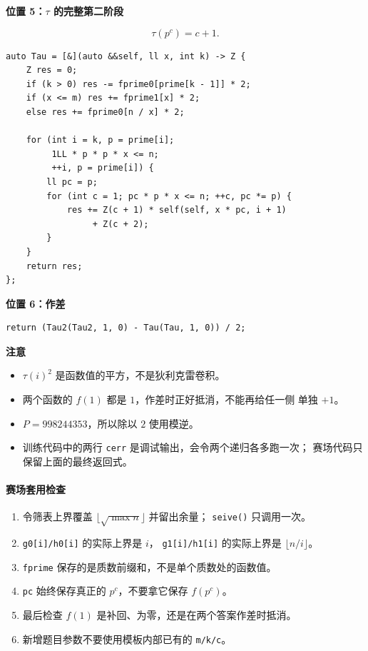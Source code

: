 \textbf{位置 5：\(\tau\) 的完整第二阶段}

\[
\tau(p^c)=c+1.
\]

\begin{verbatim}
auto Tau = [&](auto &&self, ll x, int k) -> Z {
    Z res = 0;
    if (k > 0) res -= fprime0[prime[k - 1]] * 2;
    if (x <= m) res += fprime1[x] * 2;
    else res += fprime0[n / x] * 2;

    for (int i = k, p = prime[i];
         1LL * p * p * x <= n;
         ++i, p = prime[i]) {
        ll pc = p;
        for (int c = 1; pc * p * x <= n; ++c, pc *= p) {
            res += Z(c + 1) * self(self, x * pc, i + 1)
                 + Z(c + 2);
        }
    }
    return res;
};
\end{verbatim}

\textbf{位置 6：作差}

\begin{verbatim}
return (Tau2(Tau2, 1, 0) - Tau(Tau, 1, 0)) / 2;
\end{verbatim}

\textbf{注意}

\begin{itemize}
    \item \(\tau(i)^2\) 是函数值的平方，不是狄利克雷卷积。
    \item 两个函数的 \(f(1)\) 都是 \(1\)，作差时正好抵消，不能再给任一侧
          单独 \(+1\)。
    \item \(P=998244353\)，所以除以 \(2\) 使用模逆。
    \item 训练代码中的两行 \texttt{cerr} 是调试输出，会令两个递归各多跑一次；
          赛场代码只保留上面的最终返回式。
\end{itemize}

\paragraph*{赛场套用检查}

\begin{enumerate}
    \item 令筛表上界覆盖 \(\lfloor\sqrt{\max n}\rfloor\) 并留出余量；
          \texttt{seive()} 只调用一次。
    \item \texttt{g0[i]/h0[i]} 的实际上界是 \(i\)，
          \texttt{g1[i]/h1[i]} 的实际上界是 \(\lfloor n/i\rfloor\)。
    \item \texttt{fprime} 保存的是质数前缀和，不是单个质数处的函数值。
    \item \texttt{pc} 始终保存真正的 \(p^c\)，不要拿它保存 \(f(p^c)\)。
    \item 最后检查 \(f(1)\) 是补回、为零，还是在两个答案作差时抵消。
    \item 新增题目参数不要使用模板内部已有的 \texttt{m/k/c}。
\end{enumerate}
